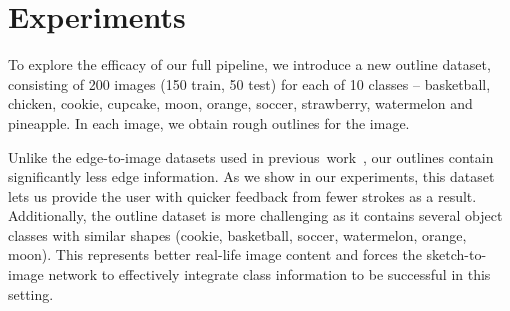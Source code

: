 
\section{Experiments}
\label{sec:experiments}


To explore the efficacy of our full pipeline, we introduce a new outline dataset, consisting of 200 images (150 train, 50 test) for each of 10 classes -- basketball, chicken, cookie, cupcake, moon, orange, soccer, strawberry,  watermelon and pineapple.
In each image, we obtain rough outlines for the image. 

Unlike the edge-to-image datasets used in previous~work~\cite{isola2016image2image,zhu2017unpaired,wang2017high}, our outlines contain significantly less edge information. 
As we show in our experiments, this dataset lets us provide the user with quicker feedback from fewer strokes as a result. 
Additionally, the outline dataset is more challenging as it contains several object classes with similar shapes (cookie, basketball, soccer, watermelon, orange, moon). This represents better real-life image content and forces the sketch-to-image network to effectively integrate class information to be successful in this setting.




